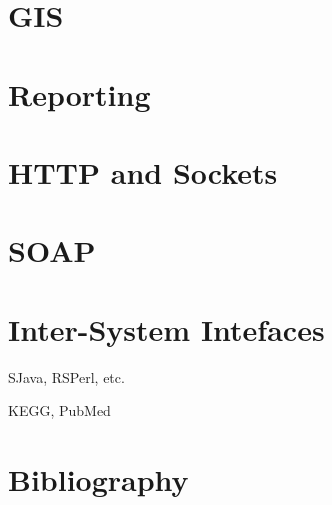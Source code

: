 \documentclass{book}
\begin{document}
\chapter{GIS}

\chapter{Reporting}

\chapter{HTTP and Sockets}

\chapter{SOAP}


\chapter{Inter-System Intefaces}
SJava, RSPerl, etc.

KEGG, PubMed



\cite{GreenBook}


\chapter{Bibliography}





\end{document}
